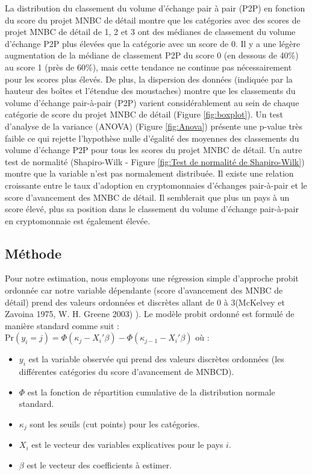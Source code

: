 \documentclass[12pt]{article}
\begin{document}
La distribution du classement du volume d'échange pair à pair (P2P) en fonction du score du projet MNBC de détail montre que les catégories avec des scores de projet MNBC de détail de 1, 2 et 3 ont des médianes de classement du volume d'échange P2P plus élevées que la catégorie avec un score de 0. Il y a une légère augmentation de la médiane de classement P2P du score 0 (en dessous de 40\%) au score 1 (près de 60\%), mais cette tendance ne continue pas nécessairement pour les scores plus élevés. De plus, la dispersion des données (indiquée par la hauteur des boîtes et l'étendue des moustaches) montre que les classements du volume d'échange pair-à-pair (P2P) varient considérablement au sein de chaque catégorie de score du projet MNBC de détail (Figure \ref{fig:boxplot}). Un test d'analyse de la variance (ANOVA) (Figure \ref{fig:Anova}) présente une p-value très faible ce qui rejette l'hypothèse nulle d'égalité des moyennes des classements du volume d'échange P2P pour tous les scores du projet MNBC de détail. Un autre test de normalité (Shapiro-Wilk - Figure \ref{fig:Test de normalité de Shapiro-Wilk}) montre que la variable n'est pas normalement distribuée. Il existe une relation croissante entre le taux d'adoption en cryptomonnaies d'échanges pair-à-pair et le score d'avancement des MNBC de détail. Il semblerait que plus un pays à un score élevé, plus sa position dans le classement du volume d'échange pair-à-pair en cryptomonnaie est également élevée.


\subsection{Méthode}

Pour notre estimation, nous employons une régression simple d'approche probit ordonnée car notre variable dépendante (score d'avancement des MNBC de détail) prend des valeurs ordonnées et discrètes allant de 0 à 3(McKelvey et Zavoina 1975, W. H. Greene 2003) \cite{Greene2003Econometric}). Le modèle probit ordonné est formulé de manière standard comme suit : $\text{Pr}(y_i = j) = \Phi(\kappa_j - X_i'\beta) - \Phi(\kappa_{j-1} - X_i'\beta)$ où :
\begin{itemize}
  \item \( y_i \) est la variable observée qui prend des valeurs discrètes ordonnées (les différentes catégories du score d'avancement de MNBCD).
  \item \( \Phi \) est la fonction de répartition cumulative de la distribution normale standard.
  \item \( \kappa_j \) sont les seuils (cut points) pour les catégories.
  \item \( X_i \) est le vecteur des variables explicatives pour le pays \(i\).
  \item \( \beta \) est le vecteur des coefficients à estimer.\\
\end{itemize}
\end{document}
